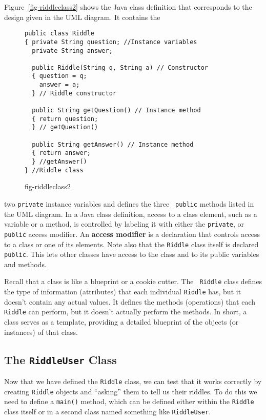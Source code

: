 Figure~\ref{fig-riddleclass2} shows the Java class definition that
corresponds to the design given in the UML diagram.  It contains the
\begin{figure}[h!]
\jjjprogstart
\begin{jjjlisting}
\begin{lstlisting}
public class Riddle
{ private String question; //Instance variables
  private String answer;

  public Riddle(String q, String a) // Constructor
  { question = q;
    answer = a;
  } // Riddle constructor

  public String getQuestion() // Instance method
  { return question;
  } // getQuestion()

  public String getAnswer() // Instance method
  { return answer;
  } //getAnswer()
} //Riddle class
\end{lstlisting}
\end{jjjlisting}
{fig-riddleclass2}
\end{figure}
two {\tt private} instance variables and defines the three {\tt
public} methods listed in the UML diagram. In a Java class definition,
access to a class element, such as a variable or a method, is
controlled by labeling it with either the {\tt private}, or {\tt
public} access modifier. An {\bf access modifier} is a declaration
that controls access to a class or one of its elements.  Note also
that the {\tt Riddle} class itself is declared {\tt public}.  This
lets other classes have access to the class and to its public
variables and methods.


Recall that a class is like a blueprint or a cookie cutter. The {\tt
Riddle} class defines the type of information (attributes) that each
individual {\tt Riddle} has, but it doesn't contain any actual values.
It defines the methods (operations) that each {\tt Riddle} can
perform, but it doesn't actually perform the methods.  In short, a
class serves as a template, providing a detailed blueprint of the
objects (or instances) of that class.

\subsection{The {\tt RiddleUser} Class}

\noindent Now that we have defined the {\tt Riddle} class, we can
test that it works correctly by creating {\tt Riddle} objects
and ``asking'' them to tell us their riddles.  To do this we need
to define a {\tt main()} method, which can be defined either within
the {\tt Riddle} class itself or in a second class named something
like {\tt RiddleUser}.  

